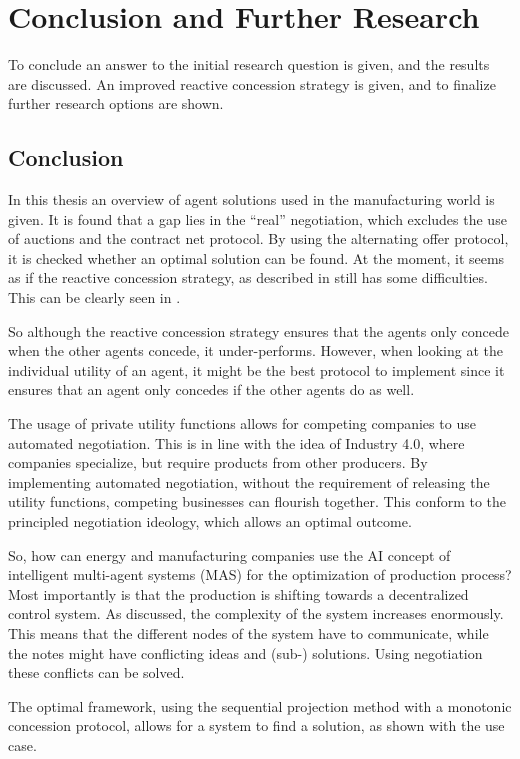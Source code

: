 \chapter{Conclusion and Further Research}
\label{ch:conc}
To conclude an answer to the initial research question is given, and the results are discussed. An improved reactive concession strategy is given, and to finalize further research options are shown. 
\section{Conclusion}
In this thesis an overview of agent solutions used in the manufacturing world is given. It is found that a gap lies in the ``real'' negotiation, which excludes the use of auctions and the contract net protocol. By using the alternating offer protocol, it is checked whether an optimal solution can be found. At the moment, it seems as if the reactive concession strategy, as described in \citet{zheng2015automated} still has some difficulties. This can be clearly seen in . 

So although the reactive concession strategy ensures that the agents only concede when the other agents concede, it under-performs. However, when looking at the individual utility of an agent, it might be the best protocol to implement since it ensures that an agent only concedes if the other agents do as well.

The usage of private utility functions allows for competing companies to use automated negotiation. This is in line with the idea of Industry 4.0, where companies specialize, but require products from other producers. By implementing automated negotiation, without the requirement of releasing the utility functions, competing businesses can flourish together. This conform to the principled negotiation ideology, which allows an optimal outcome.

So, how can energy and manufacturing companies use the AI concept of intelligent multi-agent systems (MAS) for the optimization of production process? Most importantly is that the production is shifting towards a decentralized control system. As discussed, the complexity of the system increases enormously. This means that the different nodes of the system have to communicate, while the notes might have conflicting ideas and (sub-) solutions. Using negotiation these conflicts can be solved. 

The optimal framework, using the sequential projection method with a monotonic concession protocol, allows for a system to find a solution, as shown with the use case.

